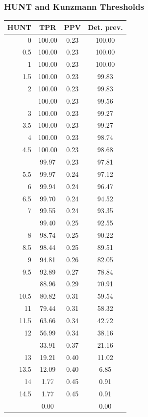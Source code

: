 \documentclass[12pt]{article}
\begin{document}
\subsubsection*{HUNT and Kunzmann Thresholds}

\begin{minipage}{0.5\textwidth}\small
\begin{tabular}{rccc}
\toprule
\textbf{HUNT} & \textbf{TPR} 
& \textbf{PPV} & \textbf{Det. prev.} \\
\midrule

0 & 100.00 & 0.23 & 100.00 \\ 
  0.5 & 100.00 & 0.23 & 100.00 \\ 
  1 & 100.00 & 0.23 & 100.00 \\ 
  1.5 & 100.00 & 0.23 & 99.83 \\ 
  2 & 100.00 & 0.23 & 99.83 \\ \addlinespace
  2.5 & 100.00 & 0.23 & 99.56 \\ 
  3 & 100.00 & 0.23 & 99.27 \\ 
  3.5 & 100.00 & 0.23 & 99.27 \\ 
  4 & 100.00 & 0.23 & 98.74 \\ 
  4.5 & 100.00 & 0.23 & 98.68 \\  \addlinespace
  5 & 99.97 & 0.23 & 97.81 \\ 
  5.5 & 99.97 & 0.24 & 97.12 \\ 
  6 & 99.94 & 0.24 & 96.47 \\ 
  6.5 & 99.70 & 0.24 & 94.52 \\ 
  7 & 99.55 & 0.24 & 93.35 \\  \addlinespace
  7.5 & 99.40 & 0.25 & 92.55 \\ 
  8 & 98.74 & 0.25 & 90.22 \\ 
  8.5 & 98.44 & 0.25 & 89.51 \\ 
  9 & 94.81 & 0.26 & 82.05 \\ 
  9.5 & 92.89 & 0.27 & 78.84 \\  \addlinespace
  10 & 88.96 & 0.29 & 70.91 \\ 
  10.5 & 80.82 & 0.31 & 59.54 \\ 
  11 & 79.44 & 0.31 & 58.32 \\ 
  11.5 & 63.66 & 0.34 & 42.72 \\ 
  12 & 56.99 & 0.34 & 38.16 \\  \addlinespace
  12.5 & 33.91 & 0.37 & 21.16 \\ 
  13 & 19.21 & 0.40 & 11.02 \\ 
  13.5 & 12.09 & 0.40 & 6.85 \\ 
  14 & 1.77 & 0.45 & 0.91 \\ 
  14.5 & 1.77 & 0.45 & 0.91 \\  \addlinespace
  15 & 0.00 &  & 0.00 \\ 

\bottomrule
\end{tabular}
\end{minipage} \hfill
\end{document}
